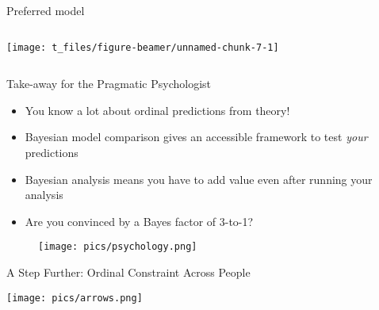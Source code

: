 \documentclass[ignorenonframetext,t]{beamer}
\providecommand{\tightlist}{%
  \setlength{\itemsep}{0pt}\setlength{\parskip}{0pt}}
\begin{document}
\begin{frame}{Preferred model}

\vspace*{1cm}

\begin{columns}


\begin{center}\texttt{[image: t\_files/figure-beamer/unnamed-chunk-7-1]} \end{center}

\end{columns}

\end{frame}

\begin{frame}{Take-away for the Pragmatic Psychologist}

\vspace*{1cm}

\begin{itemize}[<+->]
\tightlist
\item
  You know a lot about ordinal predictions from theory!
\item
  Bayesian model comparison gives an accessible framework to test
  \emph{your} predictions
\item
  Bayesian analysis means you have to add value even after running your
  analysis
\item
  Are you convinced by a Bayes factor of 3-to-1?
\end{itemize}

\vspace*{1.5cm}

\begin{figure}
\hfill
\texttt{[image: pics/psychology.png]}
\end{figure}

\end{frame}

\begin{frame}{A Step Further: Ordinal Constraint Across People}

\vspace*{1cm}

\centering \texttt{[image: pics/arrows.png]}

\end{frame}
\end{document}
